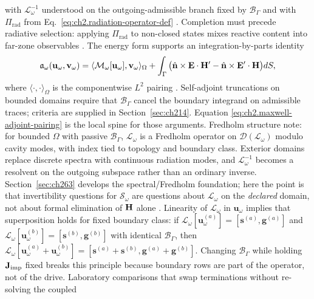 with \(\mathcal{L}_\omega^{-1}\) understood on the outgoing-admissible branch fixed by
\(\mathcal{B}_\Gamma\) and with \(\Pi_{\mathrm{rad}}\) from
Eq.~\eqref{eq:ch2.radiation-operator-def} \cite{stratton1941}. Completion must precede
radiative selection: applying \(\Pi_{\mathrm{rad}}\) to non-closed states mixes
reactive content into far-zone observables \cite{harrington2001}.
The energy form supports an integration-by-parts identity
\begin{equation}
\label{eq:ch2.maxwell-adjoint-pairing}
\mathfrak{a}_\omega(\mathbf{u}_\omega,\mathbf{v}_\omega)=
\langle\mathcal{M}_\omega[\mathbf{u}_\omega],\mathbf{v}_\omega\rangle_{\Omega}
+\int_\Gamma\big(\hat{\mathbf{n}}\times\mathbf{E}\cdot\mathbf{H}'-\hat{\mathbf{n}}\times\mathbf{E}'\cdot\mathbf{H}\big)dS,
\end{equation}
where \(\langle\cdot,\cdot\rangle_{\Omega}\) is the componentwise \(L^{2}\) pairing
\cite{stratton1941}. Self-adjoint truncations on bounded domains require that
\(\mathcal{B}_\Gamma\) cancel the boundary integrand on admissible traces; criteria
are supplied in Section~\ref{sec:ch214}. Equation
\eqref{eq:ch2.maxwell-adjoint-pairing} is the local spine for those arguments.
Fredholm structure note: for bounded \(\Omega\) with passive \(\mathcal{B}_\Gamma\), \(\mathcal{L}_\omega\) is a Fredholm operator on
\(\mathcal{D}(\mathcal{L}_\omega)\) modulo cavity modes, with index tied to
topology and boundary class. Exterior domains replace discrete spectra with
continuous radiation modes, and \(\mathcal{L}_\omega^{-1}\) becomes a resolvent on
the outgoing subspace rather than an ordinary inverse. Section~\ref{sec:ch263}
develops the spectral/Fredholm foundation; here the point is that invertibility questions
for \(\mathcal{S}_\omega\) are questions about \(\mathcal{L}_\omega\) on the
\emph{declared} domain, not about formal elimination of \(\mathbf{H}\) alone
\cite{harrington2001}.
Linearity of \(\mathcal{L}_\omega\) in \(\mathbf{u}_\omega\) implies that
superposition holds for fixed boundary class: if
\(\mathcal{L}_\omega[\mathbf{u}_\omega^{(a)}]=[\mathbf{s}^{(a)},\mathbf{g}^{(a)}]\)
and \(\mathcal{L}_\omega[\mathbf{u}_\omega^{(b)}]=[\mathbf{s}^{(b)},\mathbf{g}^{(b)}]\)
with identical \(\mathcal{B}_\Gamma\), then
\(\mathcal{L}_\omega[\mathbf{u}_\omega^{(a)}+\mathbf{u}_\omega^{(b)}]=
[\mathbf{s}^{(a)}+\mathbf{s}^{(b)},\mathbf{g}^{(a)}+\mathbf{g}^{(b)}]\).
Changing \(\mathcal{B}_\Gamma\) while holding \(\mathbf{J}_{\mathrm{imp}}\) fixed breaks this
principle because boundary rows are part of the operator, not of the drive.
Laboratory comparisons that swap terminations without re-solving the coupled

